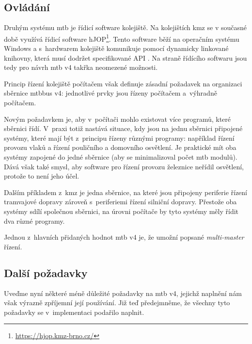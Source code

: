 \subsection{Ovládání}

Druhým  systému \gls{mtb} je řídicí software kolejiště. Na
kolejištích \gls{kmz} se v současné době využívá řídicí software
hJOP\footnote{\url{https://hjop.kmz-brno.cz/}}. Tento software běží na
operačním systému Windows a s~hardwarem kolejiště komunikuje pomocí dynamicky
linkované knihovny, která musí dodržet specifikované API \cite{hjop:rcs:web}.
Na straně řídícího softwaru jsou tedy pro návrh \gls{mtb} v4 takřka neomezené
možnosti.

Princip řízení kolejiště počítačem však definuje zásadní požadavek na
organizaci sběrnice \gls{mtbbus} v4: jednotlivé prvky jsou řízeny počítačem
a~výhradně počítačem.

Novým požadavkem je, aby v~počítači mohlo existovat více programů, které
sběrnici řídí. V~praxi totiž nastává situace, kdy jsou na jednu sběrnici
připojené systémy, které mají být z~principu řízeny různými programy: například
řízení provozu vlaků a řízení pouličního a domovního osvětlení.  Je praktické mít
oba systémy zapojené do jedné sběrnice (aby se minimalizoval počet \gls{mtb}
modulů). Dává však také smysl, aby software pro řízení provozu železnice neřídil
osvětlení, protože to není jeho účel.

Dalším příkladem z~\gls{kmz} je jedna sběrnice, na které jsou připojeny
periferie řízení tramvajové dopravy zároveň s~periferiemi řízení silniční
dopravy. Přestože oba systémy sdílí společnou sběrnici, na úrovni počítače by
tyto systémy měly řídit dva různé programy.

Jednou z~hlavních přidaných hodnot \gls{mtb} v4 je, že umožní popsané
\textit{multi-master} řízení.

\subsection{Další požadavky}

Uveďme nyní některé méně důležité požadavky na \gls{mtb} v4, jejichž naplnění
nám však výrazně zpříjemní její používání. Již teď předejmněme, že všechny tyto
požadavky se v~implementaci podařilo naplnit.

